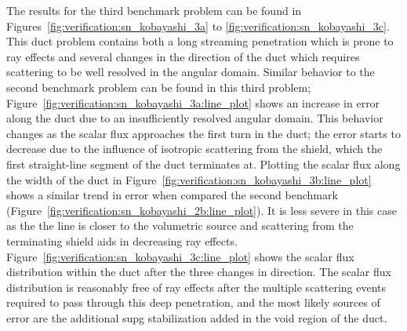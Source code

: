 The results for the third benchmark problem can be found in Figures~\ref{fig:verification:sn_kobayashi_3a} to \ref{fig:verification:sn_kobayashi_3c}. This duct problem contains both a long streaming penetration which is prone to ray effects and several changes in the direction of the duct which requires scattering to be well resolved in the angular domain. Similar behavior to the second benchmark problem can be found in this third problem; Figure~\ref{fig:verification:sn_kobayashi_3a:line_plot} shows an increase in error along the duct due to an insufficiently resolved angular domain. This behavior changes as the scalar flux approaches the first turn in the duct; the error starts to decrease due to the influence of isotropic scattering from the shield, which the first straight-line segment of the duct terminates at. Plotting the scalar flux along the width of the duct in Figure~\ref{fig:verification:sn_kobayashi_3b:line_plot} shows a similar trend in error when compared the second benchmark (Figure~\ref{fig:verification:sn_kobayashi_2b:line_plot}). It is less severe in this case as the the line is closer to the volumetric source and scattering from the terminating shield aids in decreasing ray effects. Figure~\ref{fig:verification:sn_kobayashi_3c:line_plot} shows the scalar flux distribution within the duct after the three changes in direction. The scalar flux distribution is reasonably free of ray effects after the multiple scattering events required to pass through this deep penetration, and the most likely sources of error are the additional \acrshort{supg} stabilization added in the void region of the duct.

